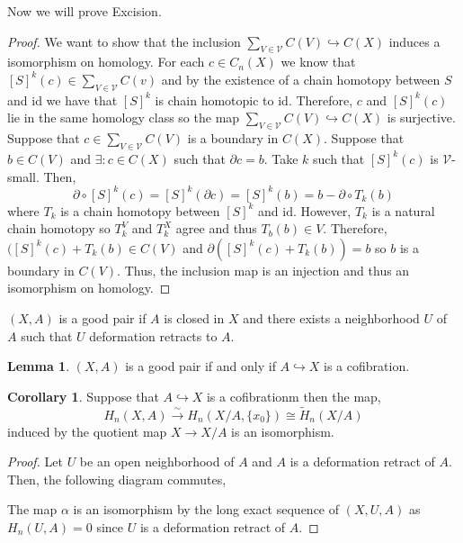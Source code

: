 \documentclass[12pt]{extarticle}
\newcommand{\id}{\mathrm{id}}
\theoremstyle{definition}
\newtheorem{lemma}[theorem]{Lemma}
\newtheorem{corollary}[theorem]{Corollary}
\newenvironment{definition}[1][Definition:]{\begin{trivlist}
\item[\hskip \labelsep {\bfseries #1}]}{\end{trivlist}}
\newcommand{\hook}{\hookrightarrow}
\begin{document}
Now we will prove Excision.
\begin{proof}
We want to show that the inclusion $\sum_{V \in \mathcal{V}} C(V) \hook C(X)$ induces a isomorphism on homology. For each $c \in C_n(X)$ we know that $[S]^k(c) \in \sum_{V \in \mathcal{V}} C(v)$ and by the existence of a chain homotopy between $S$ and $\id$ we have that $[S]^k$ is chain homotopic to $\id$. Therefore, $c$ and $[S]^k(c)$ lie in the same homology class so the map $\sum_{V \in \mathcal{V}} C(V) \hook C(X)$ is surjective. Suppose that $c \in \sum_{V \in \mathcal{V}} C(V)$ is a boundary in $C(X)$. Suppose that $b \in C(V)$ and $\exists : c \in C(X)$ such that $\partial c = b$. Take $k$ such that $[S]^k(c)$ is $\mathcal{V}$-small. Then,
\[ \partial \circ [S]^k(c) = [S]^k(\partial c) = [S]^k(b) = b - \partial \circ T_k(b) \]
where $T_k$ is a chain homotopy between $[S]^k$ and $\id$. However, $T_k$ is a natural chain homotopy so $T_k^V$ and $T_k^X$ agree and thus $T_b(b) \in V$. Therefore, $([S]^k(c) + T_k(b) \in C(V)$ and $\partial ([S]^k(c) + T_k(b)) = b$ so $b$ is a boundary in $C(V)$. Thus, the inclusion map is an injection and thus an isomorphism on homology. 
\end{proof}

\begin{definition}
$(X,A)$ is a good pair if $A$ is closed in $X$ and there exists a neighborhood $U$ of $A$ such that $U$ deformation retracts to $A$.
\end{definition}

\begin{lemma}
$(X, A)$ is a good pair if and only if $A \hook X$ is a cofibration.
\end{lemma}

\begin{corollary}
Suppose that $A \hook X$ is a cofibrationm then the map,
\[ H_n(X, A) \xrightarrow{\sim} H_n(X/A, \{x_0\}) \cong \tilde{H}_n(X/A) \]
induced by the quotient map $X \to X/A$ is an isomorphism.
\end{corollary}

\begin{proof}
Let $U$ be an open neighborhood of $A$ and $A$ is a deformation retract of $A$.
Then, the following diagram commutes,
\begin{center}
\end{center}
The map $\alpha$ is an isomorphism by the long exact sequence of $(X, U, A)$ as $H_n(U, A) = 0$ since $U$ is a deformation retract of $A$. 
\end{proof}
\end{document}
